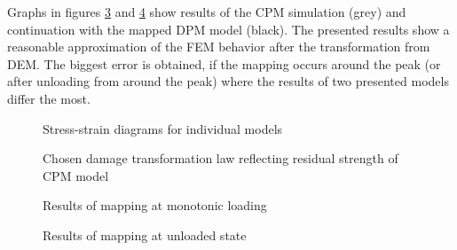 Graphs in figures \ref{figCouplingSequantialResultsMappingMonotonic} and \ref{figCouplingSequantialResultsMappingUnloaded} show results of the CPM simulation (grey) and continuation with the mapped DPM model (black).
The presented results show a reasonable approximation of the FEM behavior after the transformation from DEM.
The biggest error is obtained, if the mapping occurs around the peak (or after unloading from around the peak) where the results of two presented models differ the most.

\begin{figure}
	\centering
	\caption{Stress-strain diagrams for individual models}
	\label{figCouplingSequantialResultsPlain}
\end{figure}

\begin{figure}
	\centering
	\caption{Chosen damage transformation law reflecting residual strength of CPM model}
	\label{figCouplingSequantialResultsDmg}
\end{figure}

\begin{figure}
	\centering
	\caption{Results of mapping at monotonic loading}
	\label{figCouplingSequantialResultsMappingMonotonic}
\end{figure}

\begin{figure}
	\centering
	\caption{Results of mapping at unloaded state}
	\label{figCouplingSequantialResultsMappingUnloaded}
\end{figure}
